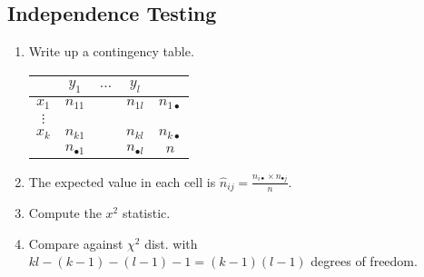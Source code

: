 \documentclass[twocolumn,english]{article}
\providecommand{\tabularnewline}{\\}
\providecommand{\tabularnewline}{\\}
\begin{document}
\subsection{Independence Testing}
\begin{enumerate}
\item Write up a contingency table.
\begin{table}[H]
\centering{}%
\begin{tabular}{c|ccc|c}
 & $y_{1}$ & $\dots$ & $y_{l}$ & \tabularnewline
\hline 
$x_{1}$ & $n_{11}$ &  & $n_{1l}$ & $n_{1\bullet}$\tabularnewline
$\vdots$ &  &  &  & \tabularnewline
$x_{k}$ & $n_{k1}$ &  & $n_{kl}$ & $n_{k\bullet}$\tabularnewline
\hline 
 & $n_{\bullet1}$ &  & $n_{\bullet l}$ & $n$\tabularnewline
\end{tabular}
\end{table}
\item The expected value in each cell is $\hat{n}_{ij}=\frac{n_{i\bullet}\times n_{\bullet j}}{n}$.
\item Compute the $x^{2}$ statistic.
\item Compare against $\chi^{2}$ dist. with $kl-\left(k-1\right)-\left(l-1\right)-1=\left(k-1\right)\left(l-1\right)$
degrees of freedom.
\end{enumerate}
\end{document}
